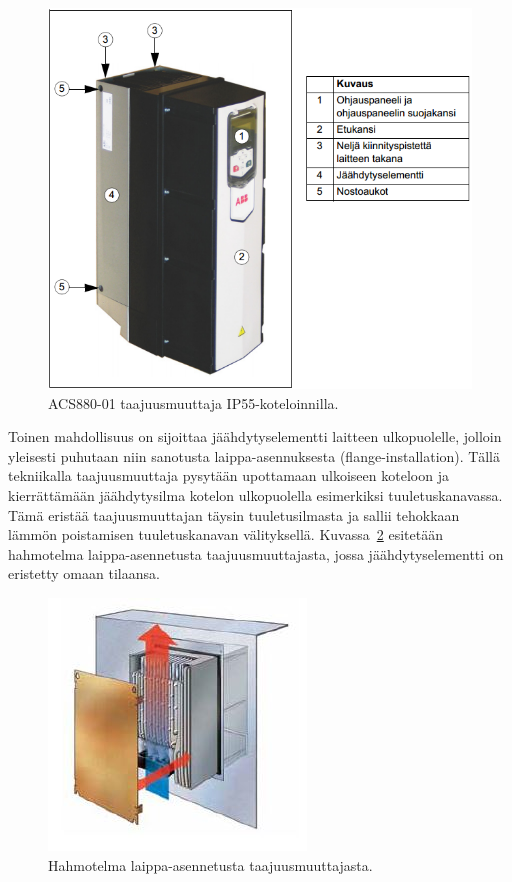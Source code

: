 \documentclass[finnish,12pt,a4paper,pdftex,elec,utf8]{aaltothesis}
\begin{document}
\begin{figure}[H]
	\begin{center}
	\includegraphics[scale=0.9]{IP55}
	\end{center}
	\caption{ACS880-01 taajuusmuuttaja IP55-koteloinnilla.
		 \cite[s.28]{880hwman}}
	\label{fig:IP55}
\end{figure}

\noindent
Toinen mahdollisuus on sijoittaa jäähdytyselementti laitteen ulkopuolelle, jolloin yleisesti puhutaan niin sanotusta laippa-asennuksesta (flange-installation). Tällä tekniikalla taajuusmuuttaja pysytään upottamaan ulkoiseen koteloon ja kierrättämään jäähdytysilma kotelon ulkopuolella esimerkiksi tuuletuskanavassa. Tämä eristää taajuusmuuttajan täysin tuuletusilmasta ja sallii tehokkaan lämmön poistamisen tuuletuskanavan välityksellä. Kuvassa~\ref{fig:flange} esitetään hahmotelma laippa-asennetusta taajuusmuuttajasta, jossa jäähdytyselementti on eristetty omaan tilaansa.

\begin{figure}[H]
	\begin{center}
	\includegraphics{flange}
	\end{center}
	\caption{Hahmotelma laippa-asennetusta taajuusmuuttajasta.
		 \cite[s.6]{danfoss}}
	\label{fig:flange}
\end{figure}
\end{document}
